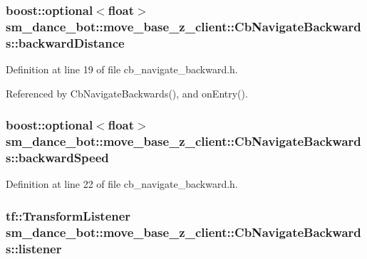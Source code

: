 \subsubsection[{\texorpdfstring{backward\+Distance}{backwardDistance}}]{\setlength{\rightskip}{0pt plus 5cm}boost\+::optional$<$float$>$ sm\+\_\+dance\+\_\+bot\+::move\+\_\+base\+\_\+z\+\_\+client\+::\+Cb\+Navigate\+Backwards\+::backward\+Distance}\hypertarget{classsm__dance__bot_1_1move__base__z__client_1_1CbNavigateBackwards_a4067b6379c6f1c8e7d6d90a1206e98f8}{}\label{classsm__dance__bot_1_1move__base__z__client_1_1CbNavigateBackwards_a4067b6379c6f1c8e7d6d90a1206e98f8}


Definition at line 19 of file cb\+\_\+navigate\+\_\+backward.\+h.



Referenced by Cb\+Navigate\+Backwards(), and on\+Entry().

\subsubsection[{\texorpdfstring{backward\+Speed}{backwardSpeed}}]{\setlength{\rightskip}{0pt plus 5cm}boost\+::optional$<$float$>$ sm\+\_\+dance\+\_\+bot\+::move\+\_\+base\+\_\+z\+\_\+client\+::\+Cb\+Navigate\+Backwards\+::backward\+Speed}\hypertarget{classsm__dance__bot_1_1move__base__z__client_1_1CbNavigateBackwards_a175ffec2b79c411ee1b88cff62ed37e9}{}\label{classsm__dance__bot_1_1move__base__z__client_1_1CbNavigateBackwards_a175ffec2b79c411ee1b88cff62ed37e9}


Definition at line 22 of file cb\+\_\+navigate\+\_\+backward.\+h.

\subsubsection[{\texorpdfstring{listener}{listener}}]{\setlength{\rightskip}{0pt plus 5cm}tf\+::\+Transform\+Listener sm\+\_\+dance\+\_\+bot\+::move\+\_\+base\+\_\+z\+\_\+client\+::\+Cb\+Navigate\+Backwards\+::listener}\hypertarget{classsm__dance__bot_1_1move__base__z__client_1_1CbNavigateBackwards_aeaaa632b142737c65bc87587aa02a3bf}{}\label{classsm__dance__bot_1_1move__base__z__client_1_1CbNavigateBackwards_aeaaa632b142737c65bc87587aa02a3bf}


